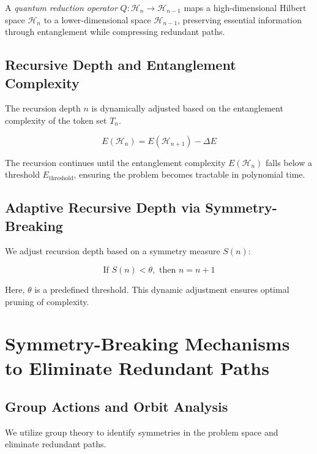 \documentclass{article}
\begin{document}
\begin{definition}
A \textit{quantum reduction operator} \( Q: \mathcal{H}_n \rightarrow \mathcal{H}_{n-1} \) maps a high-dimensional Hilbert space \( \mathcal{H}_n \) to a lower-dimensional space \( \mathcal{H}_{n-1} \), preserving essential information through entanglement while compressing redundant paths.
\end{definition}

\subsection{Recursive Depth and Entanglement Complexity}

The recursion depth \( n \) is dynamically adjusted based on the entanglement complexity of the token set \( T_n \).

\begin{equation}
E(\mathcal{H}_{n}) = E(\mathcal{H}_{n+1}) - \Delta E
\end{equation}

The recursion continues until the entanglement complexity \( E(\mathcal{H}_n) \) falls below a threshold \( E_{\text{threshold}} \), ensuring the problem becomes tractable in polynomial time.

\subsection{Adaptive Recursive Depth via Symmetry-Breaking}

We adjust recursion depth based on a symmetry measure \( S(n) \):

\begin{equation}
\text{If } S(n) < \theta, \text{ then } n = n + 1
\end{equation}

Here, \( \theta \) is a predefined threshold. This dynamic adjustment ensures optimal pruning of complexity.

\section{Symmetry-Breaking Mechanisms to Eliminate Redundant Paths}

\subsection{Group Actions and Orbit Analysis}

We utilize group theory to identify symmetries in the problem space and eliminate redundant paths.
\end{document}
